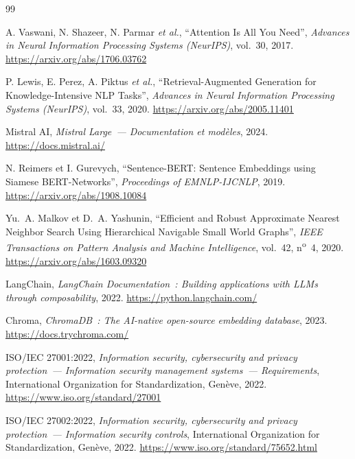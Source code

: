 \documentclass[a4paper,12pt,oneside]{report}
\begin{document}
	\begin{thebibliography}{99}
		\setlength{\itemsep}{4pt}
		
		A. Vaswani, N. Shazeer, N. Parmar \textit{et al.}, \enquote{Attention Is All You Need},
		\textit{Advances in Neural Information Processing Systems (NeurIPS)}, vol.~30, 2017.
		\url{https://arxiv.org/abs/1706.03762}
		
		P. Lewis, E. Perez, A. Piktus \textit{et al.}, \enquote{Retrieval-Augmented Generation for
			Knowledge-Intensive NLP Tasks}, \textit{Advances in Neural Information Processing Systems
			(NeurIPS)}, vol.~33, 2020.
		\url{https://arxiv.org/abs/2005.11401}
		
		Mistral AI, \textit{Mistral Large~--- Documentation et mod\`eles}, 2024.
		\url{https://docs.mistral.ai/}
		
		N. Reimers et I. Gurevych, \enquote{Sentence-BERT: Sentence Embeddings using Siamese
			BERT-Networks}, \textit{Proceedings of EMNLP-IJCNLP}, 2019.
		\url{https://arxiv.org/abs/1908.10084}
		
		Yu.~A. Malkov et D.~A. Yashunin, \enquote{Efficient and Robust Approximate Nearest
			Neighbor Search Using Hierarchical Navigable Small World Graphs}, \textit{IEEE Transactions
			on Pattern Analysis and Machine Intelligence}, vol.~42, n\textsuperscript{o}~4, 2020.
		\url{https://arxiv.org/abs/1603.09320}
		
		LangChain, \textit{LangChain Documentation~: Building applications with LLMs through
			composability}, 2022.
		\url{https://python.langchain.com/}
		
		Chroma, \textit{ChromaDB~: The AI-native open-source embedding database}, 2023.
		\url{https://docs.trychroma.com/}
		
		ISO/IEC 27001:2022, \textit{Information security, cybersecurity and privacy protection~---
			Information security management systems~--- Requirements}, International Organization for
		Standardization, Gen\`eve, 2022.
		\url{https://www.iso.org/standard/27001}
		
		ISO/IEC 27002:2022, \textit{Information security, cybersecurity and privacy protection~---
			Information security controls}, International Organization for Standardization, Gen\`eve, 2022.
		\url{https://www.iso.org/standard/75652.html}
		

\end{thebibliography}
\end{document}
